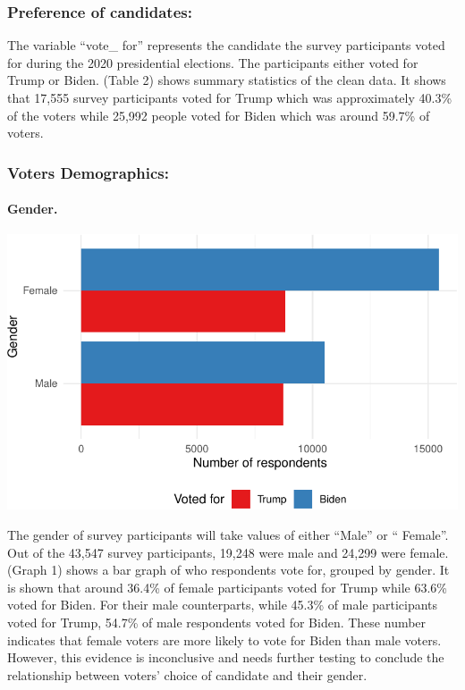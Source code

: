 \documentclass[
  letterpaper,
  DIV=11,
  numbers=noendperiod]{scrartcl}
\let\oldparagraph\paragraph
\renewcommand{\paragraph}[1]{\oldparagraph{#1}\mbox{}}
\begin{document}
\hypertarget{preference-of-candidates}{%
\subsubsection{Preference of
candidates:}\label{preference-of-candidates}}

The variable ``vote\_ for'' represents the candidate the survey
participants voted for during the 2020 presidential elections. The
participants either voted for Trump or Biden. (Table 2) shows summary
statistics of the clean data. It shows that 17,555 survey participants
voted for Trump which was approximately 40.3\% of the voters while
25,992 people voted for Biden which was around 59.7\% of voters.

\hypertarget{voters-demographics}{%
\subsubsection{Voters Demographics:}\label{voters-demographics}}

\hypertarget{gender.}{%
\paragraph{Gender.}\label{gender.}}

\includegraphics{paper_files/figure-pdf/unnamed-chunk-4-1.pdf}

The gender of survey participants will take values of either ``Male'' or
`` Female''. Out of the 43,547 survey participants, 19,248 were male and
24,299 were female. (Graph 1) shows a bar graph of who respondents vote
for, grouped by gender. It is shown that around 36.4\% of female
participants voted for Trump while 63.6\% voted for Biden. For their
male counterparts, while 45.3\% of male participants voted for Trump,
54.7\% of male respondents voted for Biden. These number indicates that
female voters are more likely to vote for Biden than male voters.
However, this evidence is inconclusive and needs further testing to
conclude the relationship between voters' choice of candidate and their
gender.
\end{document}
